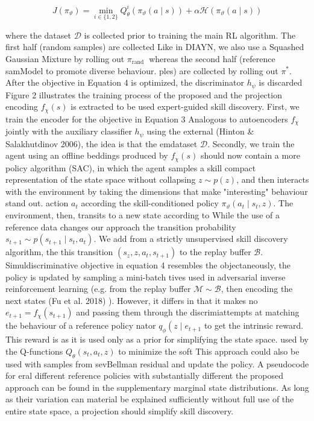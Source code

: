 $$
J\left(\pi_{\vartheta}\right)=\min _{i \in\{1,2\}} Q_{\theta}^{i}\left(\pi_{\vartheta}(a \mid s)\right)+\alpha \mathcal{H}\left(\pi_{\vartheta}(a \mid s)\right)
$$

where the dataset $\mathcal{D}$ is collected prior to training the main RL algorithm. The first half (random samples) are collected Like in DIAYN, we also use a Squashed Gaussian Mixture by rolling out $\pi_{\text {rand }}$ whereas the second half (reference samModel to promote diverse behaviour. ples) are collected by rolling out $\pi^{*}$. After the objective in Equation 4 is optimized, the discriminator $h_{\psi}$ is discarded Figure 2 illustrates the training process of the proposed and the projection encoding $f_{\chi}(s)$ is extracted to be used expert-guided skill discovery. First, we train the encoder for the objective in Equation 3 Analogous to autoencoders $f_{\chi}$ jointly with the auxiliary classifier $h_{\psi}$ using the external (Hinton \& Salakhutdinov 2006), the idea is that the emdataset $\mathcal{D}$. Secondly, we train the agent using an offline beddings produced by $f_{\chi}(s)$ should now contain a more policy algorithm (SAC), in which the agent samples a skill compact representation of the state space without collapsing $z \sim p(z)$, and then interacts with the environment by taking the dimensions that make "interesting" behaviour stand out. action $a_{t}$ according the skill-conditioned policy $\pi_{\vartheta}\left(a_{t} \mid s_{t}, z\right)$. The environment, then, transits to a new state according to While the use of a reference data changes our approach the transition probability $s_{t+1} \sim p\left(s_{t+1} \mid s_{t}, a_{t}\right)$. We add from a strictly unsupervised skill discovery algorithm, the this transition $\left(s_{z}, z, a_{t}, s_{t+1}\right)$ to the replay buffer $\mathcal{B}$. Simuldiscriminative objective in equation 4 resembles the objectaneously, the policy is updated by sampling a mini-batch tives used in adversarial inverse reinforcement learning (e.g. from the replay buffer $\mathcal{M} \sim \mathcal{B}$, then encoding the next states (Fu et al. 2018) ). However, it differs in that it makes no $e_{t+1}=f_{\chi}\left(s_{t+1}\right)$ and passing them through the discrimiattempts at matching the behaviour of a reference policy nator $q_{\phi}\left(z \mid e_{t+1}\right.$ to get the intrinsic reward. This reward is as it is used only as a prior for simplifying the state space. used by the Q-functions $Q_{\theta}\left(s_{t}, a_{t}, z\right)$ to minimize the soft This approach could also be used with samples from sevBellman residual and update the policy. A pseudocode for eral different reference policies with substantially different the proposed approach can be found in the supplementary marginal state distributions. As long as their variation can material be explained sufficiently without full use of the entire state space, a projection should simplify skill discovery.

